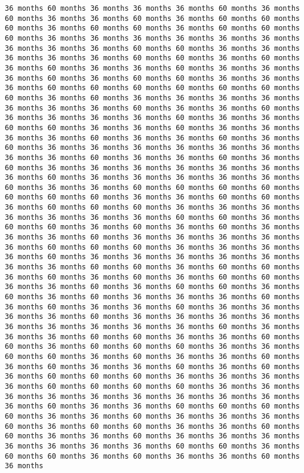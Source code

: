 \documentclass[11pt]{article}
\begin{document}
\begin{Verbatim}[commandchars=\\\{\}, frame=single, framerule=2mm, rulecolor=\color{outerrorbackground}]
36 months 60 months 36 months 36 months 36 months 60 months 36 months 60 months 36 months 36 months 60 months 36 months 60 months 60 months 60 months 36 months 60 months 60 months 36 months 60 months 60 months 60 months 36 months 36 months 36 months 36 months 36 months 36 months 36 months 36 months 36 months 60 months 60 months 36 months 36 months 36 months 36 months 36 months 60 months 60 months 36 months 60 months 36 months 60 months 36 months 36 months 60 months 36 months 36 months 36 months 60 months 36 months 60 months 60 months 36 months 36 months 36 months 60 months 60 months 60 months 60 months 60 months 60 months 60 months 36 months 60 months 36 months 36 months 36 months 36 months 36 months 36 months 36 months 60 months 36 months 36 months 60 months 36 months 36 months 36 months 36 months 60 months 36 months 36 months 60 months 60 months 36 months 36 months 60 months 36 months 36 months 36 months 36 months 60 months 36 months 36 months 60 months 36 months 60 months 36 months 36 months 36 months 36 months 36 months 36 months 36 months 36 months 60 months 36 months 36 months 60 months 36 months 60 months 36 months 36 months 36 months 36 months 36 months 36 months 36 months 60 months 36 months 36 months 36 months 36 months 36 months 60 months 36 months 36 months 60 months 60 months 60 months 60 months 60 months 60 months 60 months 36 months 36 months 60 months 60 months 36 months 60 months 60 months 60 months 36 months 36 months 36 months 36 months 36 months 36 months 36 months 60 months 60 months 36 months 60 months 60 months 36 months 60 months 36 months 60 months 36 months 36 months 36 months 60 months 36 months 36 months 36 months 36 months 36 months 60 months 60 months 60 months 36 months 36 months 36 months 36 months 60 months 36 months 36 months 36 months 36 months 36 months 36 months 36 months 60 months 60 months 36 months 60 months 60 months 36 months 60 months 36 months 60 months 36 months 60 months 60 months 36 months 36 months 60 months 36 months 60 months 60 months 36 months 60 months 36 months 60 months 36 months 36 months 36 months 60 months 36 months 60 months 36 months 36 months 60 months 36 months 36 months 36 months 36 months 60 months 36 months 36 months 36 months 36 months 36 months 36 months 36 months 36 months 36 months 60 months 36 months 36 months 36 months 60 months 60 months 36 months 36 months 60 months 60 months 36 months 60 months 60 months 60 months 36 months 36 months 60 months 60 months 36 months 60 months 36 months 36 months 60 months 36 months 60 months 36 months 36 months 60 months 36 months 60 months 36 months 60 months 60 months 60 months 36 months 36 months 36 months 36 months 60 months 60 months 60 months 60 months 36 months 36 months 36 months 36 months 36 months 36 months 36 months 36 months 36 months 36 months 60 months 36 months 36 months 60 months 60 months 60 months 60 months 36 months 36 months 60 months 36 months 36 months 36 months 60 months 36 months 60 months 60 months 36 months 36 months 60 months 60 months 36 months 36 months 60 months 36 months 36 months 36 months 36 months 36 months 36 months 36 months 60 months 60 months 36 months 60 months 60 months 36 months 60 months 36 months 36 months 60 months 36 months 
\end{Verbatim}
\end{document}
